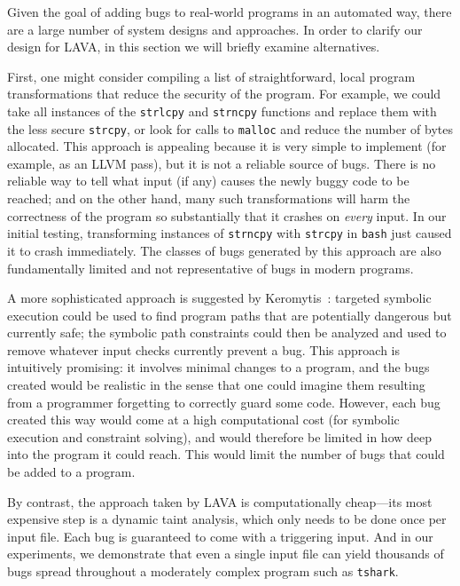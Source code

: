 Given the goal of adding bugs to real-world programs in an automated way, there are a large number of system designs and approaches.
In order to clarify our design for LAVA, in this section we will briefly examine alternatives.

First, one might consider compiling a list of straightforward, local program transformations that reduce the security of the program. 
For example, we could take all instances of the \texttt{strlcpy} and \texttt{strncpy} functions and replace them with the less secure \texttt{strcpy}, or look for calls to \texttt{malloc} and reduce the number of bytes allocated.
This approach is appealing because it is very simple to implement (for example, as an LLVM pass), but it is not a reliable source of bugs. 
There is no reliable way to tell what input (if any) causes the newly buggy code to be reached; and on the other hand, many such transformations will harm the correctness of the program so substantially that it crashes on \emph{every} input.
In our initial testing, transforming instances of \texttt{strncpy} with \texttt{strcpy} in \texttt{bash} just caused it to crash immediately.
The classes of bugs generated by this approach are also fundamentally limited and not representative of bugs in modern programs.

A more sophisticated approach is suggested by Keromytis~\cite{}: targeted symbolic execution could be used to find program paths that are potentially dangerous but currently safe; the symbolic path constraints could then be analyzed and used to remove whatever input checks currently prevent a bug. 
This approach is intuitively promising: it involves minimal changes to a program, and the bugs created would be realistic in the sense that one could imagine them resulting from a programmer forgetting to correctly guard some code. 
However, each bug created this way would come at a high computational cost (for symbolic execution and constraint solving), and would therefore be limited in how deep into the program it could reach. 
This would limit the number of bugs that could be added to a program.

By contrast, the approach taken by LAVA is computationally cheap---its most expensive step is a dynamic taint analysis, which only needs to be done once per input file. 
Each bug is guaranteed to come with a triggering input. 
And in our experiments, we demonstrate that even a single input file can yield thousands of bugs spread throughout a moderately complex program such as \texttt{tshark}.
